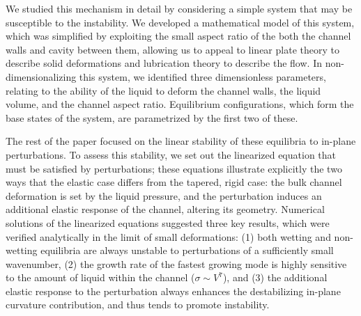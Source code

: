 \documentclass{jfm}
\begin{document}
We studied this mechanism in detail by considering a simple system that may be susceptible to the instability. We developed a mathematical model of this system, which was simplified by exploiting the small aspect ratio of the both the channel walls and cavity between them, allowing us to appeal to linear plate theory to describe solid deformations and lubrication theory to describe the flow. In non-dimensionalizing this system, we identified three dimensionless parameters, relating to the ability of the liquid to deform the channel walls, the liquid volume, and the channel aspect ratio. Equilibrium configurations, which form the base states of the system, are parametrized by the first two of these. 

The rest of the paper focused on the linear stability of these equilibria to in-plane perturbations. To assess this stability, we set out the linearized equation that must be satisfied by perturbations; these equations illustrate explicitly the two ways that the elastic case differs from the tapered, rigid case: the bulk channel deformation is set by the liquid pressure, and the perturbation induces an additional elastic response of the channel, altering its geometry. Numerical solutions of the linearized equations suggested three key results, which were verified analytically in the limit of small deformations: (1) both wetting and non-wetting equilibria are always unstable to perturbations of a sufficiently small wavenumber, (2) the growth rate of the fastest growing mode is highly sensitive to the amount of liquid within the channel ($\sigma \sim V^7$), and (3) the additional elastic response to the perturbation always enhances the destabilizing in-plane curvature contribution, and thus tends to promote instability.

\end{document}
